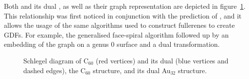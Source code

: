 Both  and its dual , as well as their graph representation are
depicted in figure~\ref{fig:C60dual}. This relationship was first noticed in
conjunction with the prediction of
,\autocite{Johansson_Au3224CaratGolden_2004} and it allows the usage of
the same algorithms used to construct fullerenes to create \acp{GDF}. For
example, the generalised face-spiral
algorithm\autocite{Fowler-atlas-2006,Schwerdtfeger_Programfullerenesoftware_2013,Wirz-2014,Schwerdtfeger_topologyfullerenes_2015}
followed up by an embedding of the graph on a genus 0 surface and a dual
transformation.
%
\begin{figure}[htb]
    \begin{center}
        \hspace{0.05\textwidth}
        \hspace{0.034\textwidth}
        \caption{\protect{} Schlegel diagram of C$_{60}$ (red
        vertices) and its dual (blue vertices and dashed edges),
        \protect{} the C$_{60}$ structure, and
        \protect{} its dual Au$_{32}$ structure.}
    \label{fig:C60dual}
    \end{center}
\end{figure}
%

